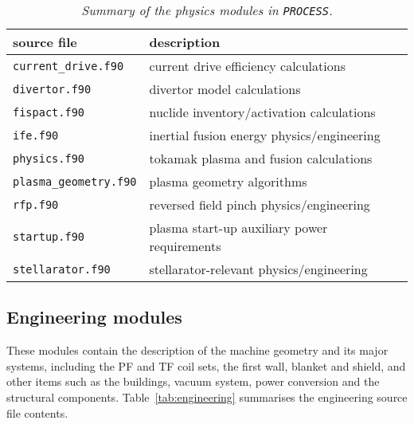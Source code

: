 \documentclass[11pt,a4paper]{report}
\newcommand{\process}{\mbox{\texttt{PROCESS}}}
\begin{document}
\begin{table}[tbph]
\begin{center}

\begin{tabular}{||l||l||} \hline
source file   & description \\ \hline
\texttt{current\_drive.f90} & current drive efficiency calculations \\
\texttt{divertor.f90} & divertor model calculations\\
\texttt{fispact.f90} & nuclide inventory/activation calculations \\
\texttt{ife.f90} & inertial fusion energy physics/engineering \\
\texttt{physics.f90} & tokamak plasma and fusion calculations \\
\texttt{plasma\_geometry.f90} & plasma geometry algorithms \\
\texttt{rfp.f90} & reversed field pinch physics/engineering \\
\texttt{startup.f90} & plasma start-up auxiliary power requirements \\
\texttt{stellarator.f90 } & stellarator-relevant physics/engineering \\
\hline
\end{tabular}
\end{center}
\caption[Summary of physics modules]
{\label{tab:physics}
  \textit{Summary of the physics modules in \process.}
}
\end{table}

\subsection{Engineering modules}

These modules contain the description of the machine geometry and its major
systems, including the PF and TF coil sets, the first wall, blanket and
shield, and other items such as the buildings, vacuum system, power conversion
and the structural components.  Table~\ref{tab:engineering} summarises the
engineering source file contents.
\end{document}
